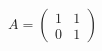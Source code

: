 \documentclass[preview]{standalone}
\begin{document}
\begin{align*}
A = \begin{pmatrix} 1 & 1 \\ 0 & 1 \end{pmatrix}
\end{align*}
\end{document}
